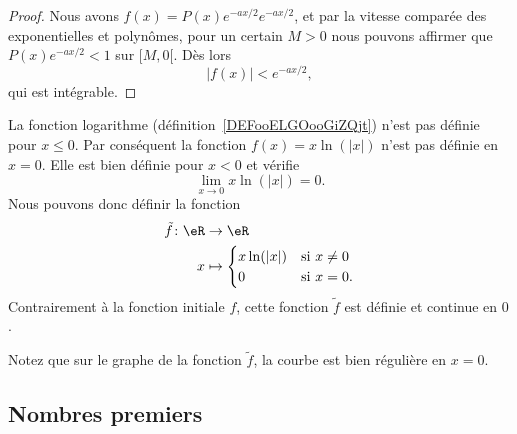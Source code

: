 \begin{proof}
    Nous avons \( f(x)=P(x) e^{-ax/2} e^{-ax/2}\), et par la vitesse comparée des exponentielles et polynômes, pour un certain \( M>0\) nous pouvons affirmer que \( P(x) e^{-ax/2}<1\) sur \( \mathopen[ M , 0 [\). Dès lors
        \begin{equation}
            | f(x) |< e^{-ax/2},
        \end{equation}
        qui est intégrable.
\end{proof}

\begin{example}     \label{EXooAGEOooQdQkrS}
    La fonction logarithme (définition~\ref{DEFooELGOooGiZQjt}) n'est pas définie pour \( x\leq 0\). Par conséquent la fonction \( f(x)=x\ln(|x|)\) n'est pas définie en \( x=0\). Elle est bien définie pour \( x<0\) et vérifie
    \begin{equation}
        \lim_{x\to 0} x\ln(|x|)=0.
    \end{equation}
    Nous pouvons donc définir la fonction
    \begin{equation}
        \begin{aligned}
            \tilde f\colon \eR&\to \eR \\
            x&\mapsto \begin{cases}
                x\ln(| x |)    &   \text{si } x\neq 0\\
                0    &    \text{si } x=0.
            \end{cases}
        \end{aligned}
    \end{equation}
    Contrairement à la fonction initiale \( f\), cette fonction \( \tilde f\) est définie et continue en \( 0\).

    Notez que sur le graphe de la fonction \( \tilde f\), la courbe est bien régulière en \( x=0\).
    \begin{center}
       
    \end{center}
\end{example}

\subsection{Nombres premiers}

